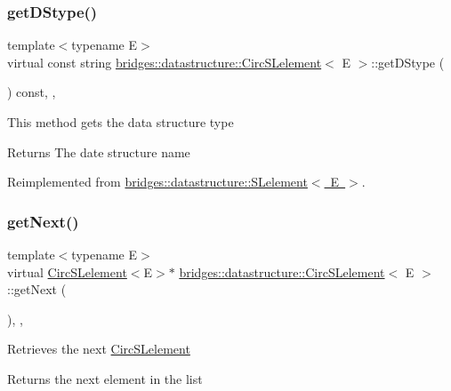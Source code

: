 \subsubsection{\texorpdfstring{getDStype()}{getDStype()}}
{\footnotesize\ttfamily template$<$typename E$>$ \\
virtual const string \mbox{\hyperlink{classbridges_1_1datastructure_1_1_circ_s_lelement}{bridges\+::datastructure\+::\+Circ\+S\+Lelement}}$<$ E $>$\+::get\+D\+Stype (\begin{DoxyParamCaption}{ }\end{DoxyParamCaption}) const\hspace{0.3cm}{\ttfamily [inline]}, {\ttfamily [override]}, {\ttfamily [virtual]}}

This method gets the data structure type

\begin{DoxyReturn}{Returns}
The date structure name 
\end{DoxyReturn}


Reimplemented from \mbox{\hyperlink{classbridges_1_1datastructure_1_1_s_lelement_a602156aacacd73d1faa365d68d8af31b}{bridges\+::datastructure\+::\+S\+Lelement$<$ E $>$}}.

\mbox{\label{classbridges_1_1datastructure_1_1_circ_s_lelement_aff77056ace1361a35a09dc006eba34a3}} 
\subsubsection{\texorpdfstring{getNext()}{getNext()}}
{\footnotesize\ttfamily template$<$typename E$>$ \\
virtual \mbox{\hyperlink{classbridges_1_1datastructure_1_1_circ_s_lelement}{Circ\+S\+Lelement}}$<$E$>$$\ast$ \mbox{\hyperlink{classbridges_1_1datastructure_1_1_circ_s_lelement}{bridges\+::datastructure\+::\+Circ\+S\+Lelement}}$<$ E $>$\+::get\+Next (\begin{DoxyParamCaption}{ }\end{DoxyParamCaption})\hspace{0.3cm}{\ttfamily [inline]}, {\ttfamily [override]}, {\ttfamily [virtual]}}

Retrieves the next \mbox{\hyperlink{classbridges_1_1datastructure_1_1_circ_s_lelement}{Circ\+S\+Lelement}} \begin{DoxyReturn}{Returns}
the next element in the list 
\end{DoxyReturn}


